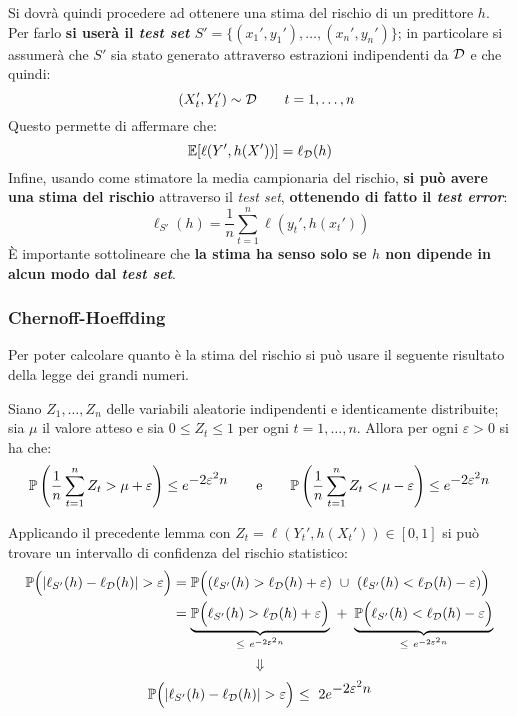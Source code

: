 Si dovrà quindi procedere ad ottenere una stima del rischio di un predittore $h$.
Per farlo 
\textbf{si userà il \textit{test set} $S'=\{(x_1',y_1'),\dots,(x_n',y_n')\}$};
in particolare si assumerà che $S'$ sia stato generato attraverso estrazioni 
indipendenti da $\mathcal{D}$ e che quindi:
\begin{equation}
    \quad (X_t',Y_t') \sim \mathcal{D} \tag*{$t=1,\dots,n$}
\end{equation}
Questo permette di affermare che:
$$ \mathbb{E}[\ell(Y',h(X'))] = \ell_{\mathcal{D}}(h) $$
Infine, usando come stimatore la media campionaria del rischio, \textbf{si può
avere una stima del rischio} attraverso il \textit{test set}, \textbf{ottenendo
di fatto il \textit{test error}}:
$$ \ell_{S'}(h) = \frac{1}{n}\sum_{t=1}^n \ell(y_t',h(x_t')) $$
È importante sottolineare che \textbf{la stima ha senso solo se $h$ non dipende
in alcun modo dal \textit{test set}}.

\subsubsection{Chernoff-Hoeffding}
Per poter calcolare quanto  è la stima del rischio si può usare
il seguente risultato della legge dei grandi numeri.

\begin{lemma}\label{lem:chern-hoeff}
    Siano $Z_1,\dots,Z_n$ delle variabili aleatorie indipendenti e
    identicamente distribuite; sia $\mu$ il valore atteso e sia $0\leq Z_t\leq1$
    per ogni $t=1,\dots,n$. Allora per ogni $\varepsilon>0$ si ha che:
    $$ \mathbb{P} \left(
        \frac{1}{n}\sum_{t=1}^n Z_t > \mu + \varepsilon
    \right) \leq e^{\displaystyle-2\varepsilon^2n}
    \qquad \text{e} \qquad
    \mathbb{P} \left(
        \frac{1}{n}\sum_{t=1}^n Z_t < \mu - \varepsilon
    \right) \leq e^{\displaystyle-2\varepsilon^2n} $$
\end{lemma}
\vspace{1em}

Applicando il precedente lemma con $Z_t = \ell(Y_t',h(X_t')) \in [0,1]$ si
può trovare un intervallo di confidenza del rischio statistico:
$$\begin{aligned}
    \Prob \Bigl( |\ell_{S'}(h) - \ell_\D(h)| > \varepsilon \Bigl) &= 
        \Prob\Bigl((\ell_{S'}(h) > \ell_\D(h)+\varepsilon) \ \cup \ 
        (\ell_{S'}(h) < \ell_\D(h)-\varepsilon) \Bigl)\\
    &= \underbrace{\Prob\Bigl(\ell_{S'}(h) > \ell_\D(h)+\varepsilon\Bigl)}
        _{\leq \ e^{-2\varepsilon^2n}} \ + \
       \underbrace{\Prob\Bigl(\ell_{S'}(h) < \ell_\D(h)-\varepsilon \Bigl)}
       _{\leq \ e^{-2\varepsilon^2n}}
\end{aligned}$$
$$ \Downarrow $$
\begin{equation} \mathbb{P} \Bigl( |\ell_{S'}(h) - \ell_{\mathcal{D}}(h)| > \varepsilon \Bigl) 
 \ \leq \ 2e^{\displaystyle-2\varepsilon^2n} \label{eq:stat_risk_test}\end{equation}

